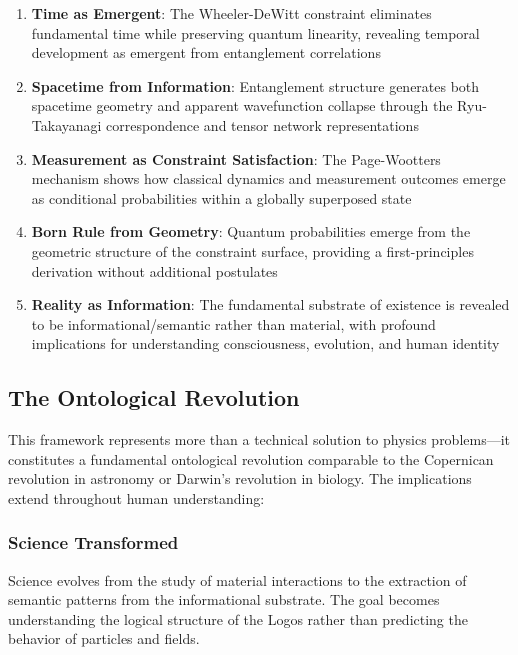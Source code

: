 \documentclass[12pt,a4paper]{article}
\begin{document}
\begin{enumerate}
    \item \textbf{Time as Emergent}: The Wheeler-DeWitt constraint eliminates fundamental time while preserving quantum linearity, revealing temporal development as emergent from entanglement correlations
    
    \item \textbf{Spacetime from Information}: Entanglement structure generates both spacetime geometry and apparent wavefunction collapse through the Ryu-Takayanagi correspondence and tensor network representations
    
    \item \textbf{Measurement as Constraint Satisfaction}: The Page-Wootters mechanism shows how classical dynamics and measurement outcomes emerge as conditional probabilities within a globally superposed state
    
    \item \textbf{Born Rule from Geometry}: Quantum probabilities emerge from the geometric structure of the constraint surface, providing a first-principles derivation without additional postulates
    
    \item \textbf{Reality as Information}: The fundamental substrate of existence is revealed to be informational/semantic rather than material, with profound implications for understanding consciousness, evolution, and human identity
\end{enumerate}

\subsection{The Ontological Revolution}

This framework represents more than a technical solution to physics problems—it constitutes a fundamental ontological revolution comparable to the Copernican revolution in astronomy or Darwin's revolution in biology. The implications extend throughout human understanding:

\subsubsection{Science Transformed}

Science evolves from the study of material interactions to the extraction of semantic patterns from the informational substrate. The goal becomes understanding the logical structure of the Logos rather than predicting the behavior of particles and fields.
\end{document}
